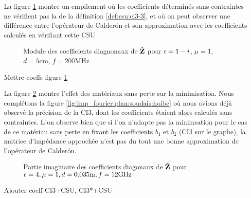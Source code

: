   La figure \ref{fig:imp_fourier:plan:stupfel:hoibc_vs_csu} montre un empilement où les coefficients déterminés sans contraintes ne vérifient pas la  de la définition \ref{def:csu:ci3-3}, et où on peut observer une différence entre l'opérateur de Calderón et son approximation avec les coefficients calculés en vérifiant cette CSU.

  \begin{figure}[!hbt]
    \centering
    
    \caption[Module de la matrice d'impédance pour le matériau M1, perte de précision à cause de la CSU]{ Module des coefficients diagnonaux de \(\hat{\mathbf{Z}}\) pour \(\epsilon = 1-i\), \(\mu = 1\), \(d=5\)cm, \(f=200\)MHz.}
    \label{fig:imp_fourier:plan:stupfel:hoibc_vs_csu}
  \end{figure}

  \begin{TODO}
    Mettre coeffs figure \ref{fig:imp_fourier:plan:stupfel:hoibc_vs_csu}
  \end{TODO}

  \FloatBarrier

  La figure \ref{fig:imp_fourier:plan:soudais:hoibc_csu} montre l'effet des matériaux sans perte sur la minimisation.
  Nous complétons la figure \ref{fig:imp_fourier:plan:soudais:hoibc} où nous avions déjà observé la précision de la CI3, dont les coefficients étaient alors calculés sans contraintes.
  L'on observe bien que si l'on n'adapte pas la minimsation pour le cas de ce matériau sans perte en fixant les coefficients \(b_1\) et \(b_2\) (CI3 sur le graphe), la matrice d'impédance approchée n'est pas du tout une bonne approximation de l'opérateur de Calderón.

  \begin{figure}[!hbt]
    \centering
    
    \caption[Partie imaginaire de l'opérateur de Calderón, comparé avec les approximations CI0, CI3, CI3 avec CSU, CI3 avec CSU adaptée pour une couche plane de matériau sans pertes de P.~Soudais]{Partie imaginaire des coefficients diagonaux de \(\hat{\mathbf{Z}}\) pour \(\epsilon = 4, \mu = 1, d=0.035\text{m}, f=12\text{GHz}\)}
    \label{fig:imp_fourier:plan:soudais:hoibc_csu}
  \end{figure}

  \begin{table}[!hbt]
    \centering
    \begin{TODO}
      Ajouter coeff CI3+CSU, CI3*+CSU
    \end{TODO}
    \caption{Coefficients associés à la figure \ref{fig:imp_fourier:plan:soudais:hoibc_csu}}
    \label{tab:imp_fourier:plan:soudais:hoibc_csu}
  \end{table}

  \FloatBarrier
